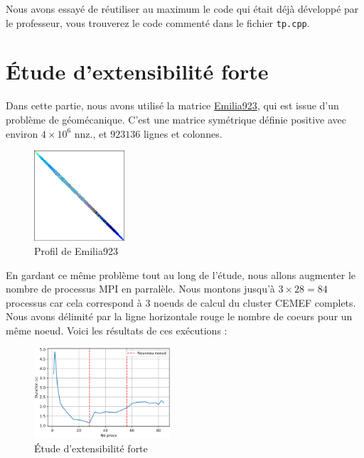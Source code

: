 \documentclass[10pt,twocolumn,letterpaper]{article}
\def\code#1{\texttt{#1}}
\begin{document}
Nous avons essayé de réutiliser au maximum le code qui était déjà développé par
le professeur, vous trouverez le code commenté dans le fichier \code{tp.cpp}.


\section{Étude d'extensibilité forte}

Dans cette partie, nous avons utilisé la matrice
\href{https://sparse.tamu.edu/Janna/Emilia_923}{Emilia923}, qui est issue d'un
problème de géomécanique. C'est une matrice symétrique définie positive avec
environ $4\times 10^6$ nnz., et $923136$ lignes et colonnes.

\begin{figure}[H]
  \centering
  \caption{Profil de Emilia923}
  \includegraphics[width=0.3\textwidth]{fig/Emilia923.png}
\end{figure}

En gardant ce même problème tout au long de l'étude, nous allons augmenter 
le nombre de processus MPI en parralèle. Nous montons jusqu'à $3 \times 28 = 84$
processus car cela correspond à $3$ noeuds de calcul du cluster CEMEF complets.
Nous avons délimité par la ligne horizontale rouge le nombre de coeurs pour un
même noeud.
Voici les résultats de ces exécutions :

\begin{figure}[H]
    \centering
    \caption{Étude d'extensibilité forte}
    \includegraphics[width=0.45\textwidth]{fig/strong_scalab.png}
  \end{figure}
\end{document}
